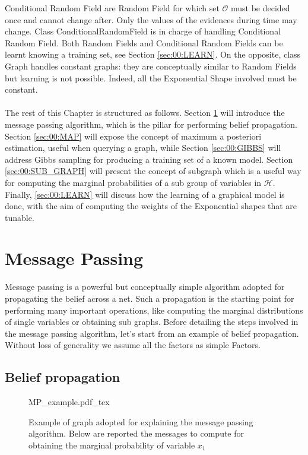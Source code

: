 Conditional Random Field are Random Field for which set $\mathcal{O}$ must be decided once and cannot change after. Only the values of the evidences during time may change. Class ConditionalRandomField is in charge of handling Conditional Random Field. 
Both Random Fields and Conditional Random Fields can be learnt knowing a training set, see Section \ref{sec:00:LEARN}. On the opposite, class Graph  handles constant graphs: they are conceptually similar to Random Fields but learning is not possible. Indeed, all the Exponential Shape involved must be constant.
\\
\\
The rest of this Chapter is structured as follows. Section \ref{sec:00:MP} will introduce the message passing algorithm, which is the pillar for performing belief propagation. Section \ref{sec:00:MAP} will expose the concept of maximum a posteriori estimation, useful when querying a graph, while Section \ref{sec:00:GIBBS} will address Gibbs sampling for producing a training set of a known model. Section \ref{sec:00:SUB_GRAPH} will present the concept of subgraph which is a useful way for computing the marginal probabilities of a sub group of variables in $\mathcal{H}$. Finally, \ref{sec:00:LEARN} will discuss how the learning of a graphical model is done, with the aim of computing the weights of the Exponential shapes that are tunable.

\section{Message Passing}
\label{sec:00:MP}

Message passing is a powerful but conceptually simple algorithm adopted for propagating the belief across a net. Such a propagation is the starting point for performing many important operations, like computing the marginal distributions of single variables or obtaining sub graphs.
Before detailing the steps involved in the message passing algorithm, let's start from an example of belief propagation.
Without loss of generality we assume all the factors as simple Factors.

\subsection{Belief propagation}

\begin{figure}
	\centering
\def\svgwidth{0.7 \textwidth}
{MP_example.pdf_tex} 
	\caption{Example of graph adopted for explaining the message passing algorithm. Below are reported the messages to compute for obtaining the marginal probability of variable $x_1$}
	\label{fig:00:example_MP}
\end{figure} 

